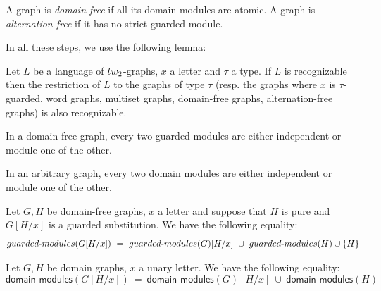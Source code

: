 \begin{definition}
A graph is \emph{domain-free} if all its domain modules are atomic. A graph is \emph{alternation-free} if it has no strict guarded module.  
\end{definition}

 In all these steps, we use the following lemma:
\begin{lemma}\label{lem:imposing-type-is-recognizable}
Let $L$ be a language of $\TWT$-graphs, $x$ a letter and $\tau$ a type. If $L$ is recognizable then the restriction of $L$ to the graphs of type $\tau$ (resp.  the graphs where $x$ is $\tau$-guarded, word graphs, multiset graphs, domain-free graphs, alternation-free graphs) is also recognizable.
\end{lemma}

\begin{lemma}\label{lem:structure-of-guarded-modules} In a domain-free graph, every two guarded modules are either independent or module one of the other.

In an arbitrary graph, every two domain modules are either independent or module one of the other.
\end{lemma}
\begin{lemma}\label{lem:tau-modules-substitution-domain-free} Let $G, H$ be domain-free graphs, $x$ a letter  and suppose that $H$ is pure and $G[H/x]$ is a guarded substitution. We have the following equality:
$$\mathsf{guarded\text{-}modules}(G[H/x])\ =\ \mathsf{guarded\text{-}modules}(G)[H/x]\ \cup\ \mathsf{guarded\text{-}modules}(H)\cup \set{H}$$
\end{lemma}
\begin{lemma}\label{lem:tau-modules-substitution-domain} Let $G, H$ be domain graphs, $x$ a unary letter. We have the following equality:
$$\mathsf{domain\text{-}modules}(G[H/x])\ =\ \mathsf{domain\text{-}modules}(G)[H/x]\ \cup\ \mathsf{domain\text{-}modules}(H)$$
\end{lemma}
%


